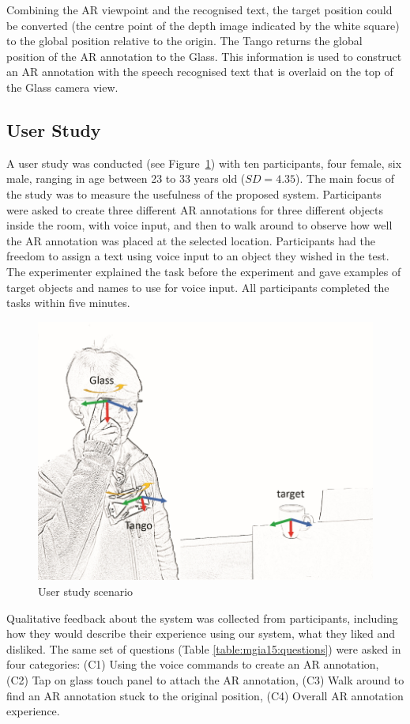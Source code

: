 Combining the AR viewpoint and the recognised text, the target position could be converted (the centre point of the depth image indicated by the white square) to the global position relative to the origin. The Tango returns the global position of the AR annotation to the Glass. This information is used to construct an AR annotation with the speech recognised text that is overlaid on the top of the Glass camera view.

\subsection{User Study}

A user study was conducted (see Figure~\ref{fig:mgia15:scenario}) with ten participants, four female, six male, ranging in age between 23 to 33 years old ($SD= 4.35$). The main focus of the study was to measure the usefulness of the proposed system. Participants were asked to create three different AR annotations for three different objects inside the room, with voice input, and then to walk around to observe how well the AR annotation was placed at the selected location. Participants had the freedom to assign a text using voice input to an object they wished in the test. The experimenter explained the task before the experiment and gave examples of target objects and names to use for voice input. All participants completed the tasks within five minutes. 

\begin{figure}
  \centering
  \includegraphics[width=0.6\linewidth]{images/62-3d-mgia15/axis_lo_small.jpg}
  \caption{User study scenario}
  \label{fig:mgia15:scenario}
\end{figure}

Qualitative feedback about the system was collected from participants, including how they would describe their experience using our system, what they liked and disliked. The same set of questions (Table \ref{table:mgia15:questions}) were asked in four categories: (C1) Using the voice commands to create an AR annotation, (C2) Tap on glass touch panel to attach the AR annotation, (C3)  Walk around to find an AR annotation stuck to the original position, (C4) Overall AR annotation experience.


